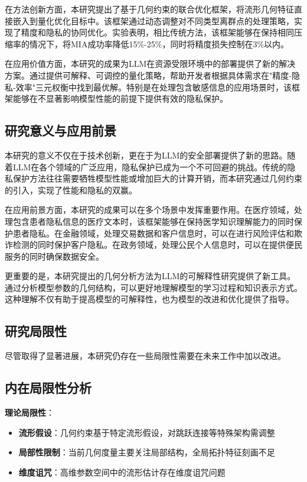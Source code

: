 在方法创新方面，本研究提出了基于几何约束的联合优化框架，将流形几何特征直接嵌入到量化优化目标中。该框架通过动态调整对不同类型离群点的处理策略，实现了精度和隐私的协同优化。实验表明，相比传统方法，该框架能够在保持相同压缩率的情况下，将MIA成功率降低15\%-25\%，同时将精度损失控制在3\%以内。

在应用价值方面，本研究的成果为LLM在资源受限环境中的部署提供了新的解决方案。通过提供可解释、可调控的量化策略，帮助开发者根据具体需求在"精度-隐私-效率"三元权衡中找到最优解。特别是在处理包含敏感信息的应用场景时，该框架能够在不显著影响模型性能的前提下提供有效的隐私保护。

\subsection{研究意义与应用前景}

本研究的意义不仅在于技术创新，更在于为LLM的安全部署提供了新的思路。随着LLM在各个领域的广泛应用，隐私保护已成为一个不可回避的挑战。传统的隐私保护方法往往需要牺牲模型性能或增加巨大的计算开销，而本研究通过几何约束的引入，实现了性能和隐私的双赢。

在应用前景方面，本研究的成果可以在多个场景中发挥重要作用。在医疗领域，处理包含患者隐私信息的医疗文本时，该框架能够在保持医学知识理解能力的同时保护患者隐私。在金融领域，处理交易数据和客户信息时，可以在进行风险评估和欺诈检测的同时保护客户隐私。在政务领域，处理公民个人信息时，可以在提供便民服务的同时确保数据安全。

更重要的是，本研究提出的几何分析方法为LLM的可解释性研究提供了新工具。通过分析模型参数的几何结构，可以更好地理解模型的学习过程和知识表示方式。这种理解不仅有助于提高模型的可解释性，也为模型的改进和优化提供了指导。

\subsection{研究局限性}

尽管取得了显著进展，本研究仍存在一些局限性需要在未来工作中加以改进。

\subsection{内在局限性分析}

\textbf{理论局限性}：
\begin{itemize}
\item \textbf{流形假设}：几何约束基于特定流形假设，对跳跃连接等特殊架构需调整
\item \textbf{局部性限制}：当前几何度量主要关注局部结构，全局拓扑特征刻画不足
\item \textbf{维度诅咒}：高维参数空间中的流形估计存在维度诅咒问题
\end{itemize}

